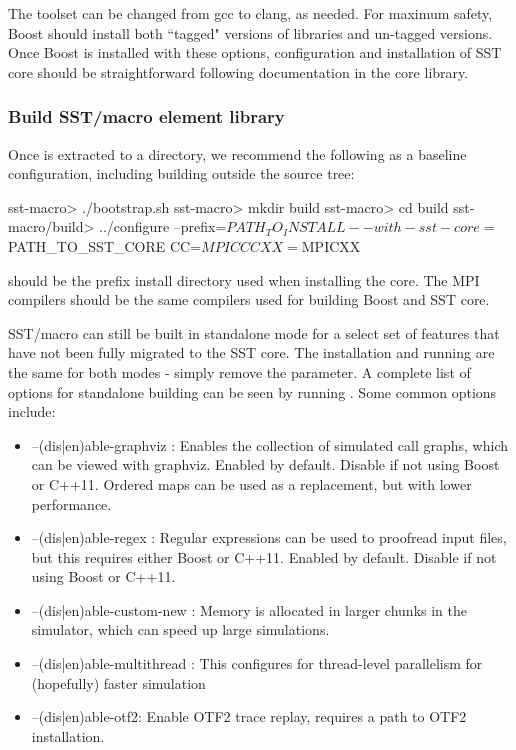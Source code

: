 The toolset can be changed from gcc to clang, as needed.  For maximum safety, Boost should install both ``tagged" versions of libraries and un-tagged versions.  Once Boost is installed with these options, configuration and installation of SST core should be straightforward following documentation in the core library.

\subsubsection{Build SST/macro element library}\label{subsec:buildElementLib}
Once \sstmacro is extracted to a directory, we recommend the following as a baseline configuration, including building outside the source tree:

\begin{ShellCmd}
sst-macro> ./bootstrap.sh
sst-macro> mkdir build
sst-macro> cd build
sst-macro/build> ../configure --prefix=$PATH_TO_INSTALL --with-sst-core=$PATH_TO_SST_CORE CC=$MPICC CXX=$MPICXX
\end{ShellCmd}
 should be the prefix install directory used when installing the core.  The MPI compilers should be the same compilers used for building Boost and SST core.

SST/macro can still be built in standalone mode for a select set of features that have not been fully migrated to the SST core.  The installation and running are the same for both modes - simply remove the  parameter.  A complete list of options for standalone building can be seen by running .   Some common options include:

\begin{itemize}
\item --(dis|en)able-graphviz : Enables the collection of simulated call graphs, which can be viewed with graphviz.
Enabled by default. Disable if not using Boost or C++11. Ordered maps can be used as a replacement, but with lower performance.
\item --(dis|en)able-regex : Regular expressions can be used to proofread input files, but this requires either Boost or C++11.
Enabled by default. Disable if not using Boost or C++11.
\item --(dis|en)able-custom-new : Memory is allocated in larger chunks in the simulator, which can speed up large simulations.
\item --(dis|en)able-multithread : This configures for thread-level parallelism for (hopefully) faster simulation
\item --(dis|en)able-otf2: Enable OTF2 trace replay, requires a path to OTF2 installation.
\end{itemize}

